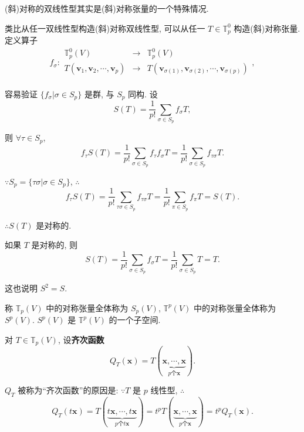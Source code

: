 \documentclass{ctexart}
\begin{document}
(斜)对称的双线性型其实是(斜)对称张量的一个特殊情况.

类比从任一双线性型构造(斜)对称双线性型, 可以从任一 $T\in\mathbb{T}_p^0$ 构造(斜)对称张量. 定义算子
\[f_\sigma:\begin{array}{rcl}
    \mathbb{T}_p^0(V) & \to & \mathbb{T}_p^0(V) \\
    T(\boldsymbol{v}_1,\boldsymbol{v}_2,\cdots,\boldsymbol{v}_p) & \to & T(\boldsymbol{v}_{\sigma(1)},\boldsymbol{v}_{\sigma(2)},\cdots,\boldsymbol{v}_{\sigma(p)}) \\
\end{array},\]

容易验证 $\{f_\sigma|\sigma\in S_p\}$ 是群, 与 $S_p$ 同构. 设
\[S(T)=\dfrac{1}{p!}\sum\limits_{\sigma\in S_p}f_\sigma T,\]

则 $\forall\tau\in S_p$,
\[f_\tau S(T)=\dfrac{1}{p!}\sum\limits_{\sigma\in S_p}f_\tau f_\sigma T=\dfrac{1}{p!}\sum\limits_{\sigma\in S_p}f_{\tau\sigma}T.\]

$\because S_p=\{\tau\sigma|\sigma\in S_p\}$, $\therefore$
\[f_\tau S(T)=\dfrac{1}{p!}\sum\limits_{\tau\sigma\in S_p}f_{\tau\sigma} T=\dfrac{1}{p!}\sum\limits_{\pi\in S_p}f_\pi T=S(T).\]

$\therefore S(T)$ 是对称的.

如果 $T$ 是对称的, 则
\[S(T)=\dfrac{1}{p!}\sum\limits_{\sigma\in S_p}f_\sigma T=\dfrac{1}{p!}\sum\limits_{\sigma\in S_p}T=T.\]

这也说明 $S^2=S$.

称 $\mathbb{T}_p(V)$ 中的对称张量全体称为 $S_p(V)$, $\mathbb{T}^p(V)$ 中的对称张量全体称为 $S^p(V)$. $S^p(V)$ 是 $\mathbb{T}^p(V)$ 的一个子空间.

对 $T\in\mathbb{T}_p(V)$, 设\textbf{齐次函数}
\begin{equation}\label{eq3.1}
    Q_T(\boldsymbol{x})=T(\underbrace{\boldsymbol{x},\cdots,\boldsymbol{x}}_{p\text{个}\boldsymbol{x}}).
\end{equation}

$Q_T$ 被称为``齐次函数''的原因是: $\because T$ 是 $p$ 线性型, $\therefore$
\[Q_T(t\boldsymbol{x})=T(\underbrace{t\boldsymbol{x},\cdots,t\boldsymbol{x}}_{p\text{个}t\boldsymbol{x}})=t^pT(\underbrace{\boldsymbol{x},\cdots,\boldsymbol{x}}_{p\text{个}\boldsymbol{x}})=t^pQ_T(\boldsymbol{x}).\]
\end{document}
